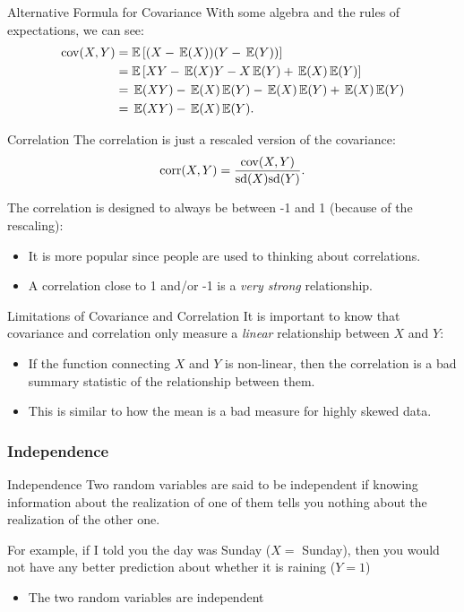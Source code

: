 \documentclass[aspectratio=169,t,11pt,table]{beamer}
\begin{document}
\begin{frame}{Alternative Formula for Covariance}
  With some algebra and the rules of expectations, we can see:
  \begin{align*}
    \cov(X, Y) 
    &= \mathbb{E}\left[ (X - \expec{X}) (Y - \expec{Y}) \right] \\
    &= \mathbb{E}\left[ XY - \expec{X} Y - X \expec{Y} + \expec{X} \expec{Y} \right] \\ 
    &= \expec{XY} - \expec{X} \expec{Y} - \expec{X} \expec{Y} + \expec{X} \expec{Y} \\
    &= \expec{XY} - \expec{X} \expec{Y}.
  \end{align*}
\end{frame}

\begin{frame}{Correlation}
  The correlation is just a rescaled version of the covariance:
  \[
    \corr(X, Y) = \frac{\cov(X, Y)}{\sd{X} \sd{Y}}.
  \]

  \bigskip
  The correlation is designed to always be between -1 and 1 (because of the rescaling):
  \begin{itemize}
    \item It is more popular since people are used to thinking about correlations.
    \item A correlation close to 1 and/or -1 is a \emph{very strong} relationship.
  \end{itemize}
\end{frame}

\begin{frame}{Limitations of Covariance and Correlation}
  It is important to know that covariance and correlation only measure a \emph{linear} relationship between $X$ and $Y$:
  \begin{itemize}
    \item If the function connecting $X$ and $Y$ is non-linear, then the correlation is a bad summary statistic of the relationship between them.
    
    \item This is similar to how the mean is a bad measure for highly skewed data.
  \end{itemize}
\end{frame}

\subsubsection*{Independence}

\begin{frame}{Independence}
  Two random variables are said to be \alert{independent} if knowing information about the realization of one of them tells you nothing about the realization of the other one.
  
  \pause
  \bigskip
  For example, if I told you the day was Sunday ($X = $ Sunday), then you would not have any better prediction about whether it is raining ($Y = 1$)
  \begin{itemize}
    \item The two random variables are independent
  \end{itemize}
\end{frame}
\end{document}
